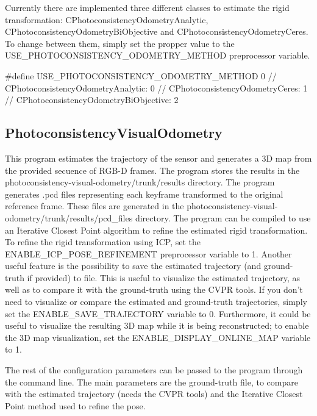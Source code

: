 Currently there are implemented three different classes to estimate the rigid transformation: CPhotoconsistencyOdometryAnalytic, CPhotoconsistencyOdometryBiObjective and CPhotoconsistencyOdometryCeres. To change between them, simply set the propper value to the USE\_\-PHOTOCONSISTENCY\_\-ODOMETRY\_\-METHOD preprocessor variable.

\begin{DoxyVerb}
#define USE_PHOTOCONSISTENCY_ODOMETRY_METHOD 0 // CPhotoconsistencyOdometryAnalytic: 0
                                               // CPhotoconsistencyOdometryCeres: 1
                                               // CPhotoconsistencyOdometryBiObjective: 2 
\end{DoxyVerb}


 \hypertarget{index_PhotoconsistencyVisualOdometry}{}\subsection{PhotoconsistencyVisualOdometry}\label{index_PhotoconsistencyVisualOdometry}
This program estimates the trajectory of the sensor and generates a 3D map from the provided secuence of RGB-\/D frames. The program stores the results in the photoconsistency-\/visual-\/odometry/trunk/results directory. The program generates .pcd files representing each keyframe transformed to the original reference frame. These files are generated in the photoconsistency-\/visual-\/odometry/trunk/results/pcd\_\-files directory. The program can be compiled to use an Iterative Closest Point algorithm to refine the estimated rigid transformation. To refine the rigid transformation using ICP, set the ENABLE\_\-ICP\_\-POSE\_\-REFINEMENT preprocessor variable to 1. Another useful feature is the possibility to save the estimated trajectory (and ground-\/truth if provided) to file. This is useful to visualize the estimated trajectory, as well as to compare it with the ground-\/truth using the CVPR tools. If you don't need to visualize or compare the estimated and ground-\/truth trajectories, simply set the ENABLE\_\-SAVE\_\-TRAJECTORY variable to 0. Furthermore, it could be useful to visualize the resulting 3D map while it is being reconstructed; to enable the 3D map visualization, set the ENABLE\_\-DISPLAY\_\-ONLINE\_\-MAP variable to 1.

The rest of the configuration parameters can be passed to the program through the command line. The main parameters are the ground-\/truth file, to compare with the estimated trajectory (needs the CVPR tools) and the Iterative Closest Point method used to refine the pose.

